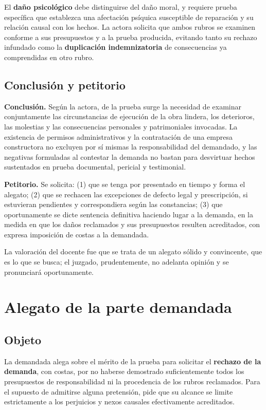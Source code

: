 \documentclass[12pt,oneside]{book}
\begin{document}
El \textbf{da\~no psicol\'ogico} debe distinguirse del da\~no moral, y requiere prueba espec\'ifica que establezca una afectaci\'on ps\'iquica susceptible de reparaci\'on y su relaci\'on causal con los hechos. La actora solicita que ambos rubros se examinen conforme a sus presupuestos y a la prueba producida, evitando tanto su rechazo infundado como la \textbf{duplicaci\'on indemnizatoria} de consecuencias ya comprendidas en otro rubro.

\subsection{Conclusi\'on y petitorio}

\textbf{Conclusi\'on.} Seg\'un la actora, de la prueba surge la necesidad de examinar conjuntamente las circunstancias de ejecuci\'on de la obra lindera, los deterioros, las molestias y las consecuencias personales y patrimoniales invocadas. La existencia de permisos administrativos y la contrataci\'on de una empresa constructora no excluyen por s\'i mismas la responsabilidad del demandado, y las negativas formuladas al contestar la demanda no bastan para desvirtuar hechos sustentados en prueba documental, pericial y testimonial.

\textbf{Petitorio.} Se solicita: (1) que se tenga por presentado en tiempo y forma el alegato; (2) que se rechacen las excepciones de defecto legal y prescripci\'on, si estuvieran pendientes y correspondiera seg\'un las constancias; (3) que oportunamente se dicte sentencia definitiva haciendo lugar a la demanda, en la medida en que los da\~nos reclamados y sus presupuestos resulten acreditados, con expresa imposici\'on de costas a la demandada.

La valoraci\'on del docente fue que se trata de un alegato s\'olido y convincente, que es lo que se busca; el juzgado, prudentemente, no adelanta opini\'on y se pronunciar\'a oportunamente.

\section{Alegato de la parte demandada}

\subsection{Objeto}

La demandada alega sobre el m\'erito de la prueba para solicitar el \textbf{rechazo de la demanda}, con costas, por no haberse demostrado suficientemente todos los presupuestos de responsabilidad ni la procedencia de los rubros reclamados. Para el supuesto de admitirse alguna pretensi\'on, pide que su alcance se limite estrictamente a los perjuicios y nexos causales efectivamente acreditados.
\end{document}
